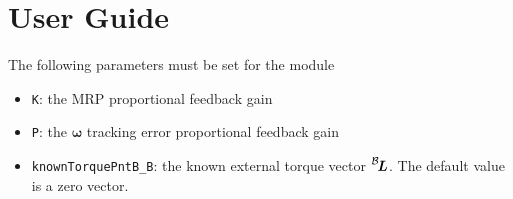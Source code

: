 
\section{User Guide}
The following parameters must be set for the module
\begin{itemize}
	\item {\tt K}: the MRP proportional feedback gain
	\item {\tt P}: the $\bm\omega$ tracking error proportional feedback gain
	\item {\tt knownTorquePntB\_B}: the known external torque vector $\leftexp{B}{\bm L}$.  The default value is a zero vector.
\end{itemize}